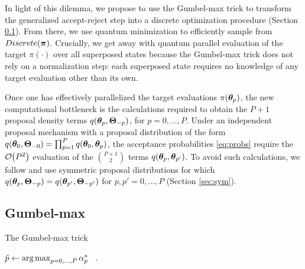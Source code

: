 \documentclass[12pt]{article} %
\newcommand{\argmax}{\operatornamewithlimits{arg\,max}}
\newcommand{\order}[1]{{\cal O}\hspace{-0.2em}\left( #1 \right)}
\begin{document}
 In light of this dilemma, we propose to use the Gumbel-max trick \citep{papandreou2011perturb} to transform the generalized accept-reject step into a discrete optimization procedure (Section \ref{sec:gm}).  From there, we use quantum minimization to efficiently sample from $Discrete(\boldsymbol{\pi})$. Crucially, we get away with quantum parallel evaluation of the target $\pi(\cdot)$ over all superposed states because the Gumbel-max trick does not rely on a normalization step: each superposed state requires no knowledge of any target evaluation other than its own.  

Once one has effectively parallelized the target evaluations $\pi(\boldsymbol{\theta}_{p})$, the new computational bottleneck is the calculations required to obtain the $P+1$ proposal density terms $q(\boldsymbol{\theta}_{p},\boldsymbol{\Theta}_{-p})$, for $p=0,\dots,P$.  Under an independent proposal mechanism with a proposal distribution of the form $q(\boldsymbol{\theta}_0,\boldsymbol{\Theta}_{-0})=\prod_{p=1}^Pq(\boldsymbol{\theta}_0,\boldsymbol{\theta}_{p})$, the acceptance probabilities \eqref{eq:probs} require the $\order{P^2}$ evaluation of the $P+1\choose 2$ terms $q(\boldsymbol{\theta}_{p},\boldsymbol{\theta}_{p'})$.  To avoid such calculations, we follow \citet{holbrook2021generating} and use symmetric proposal distributions for which $q(\boldsymbol{\theta}_{p},\boldsymbol{\Theta}_{-p}) = q(\boldsymbol{\theta}_{p'},\boldsymbol{\Theta}_{-p'})$ for $p,p'=0,\dots,P$ (Section \ref{sec:sym}).

\subsection{Gumbel-max}\label{sec:gm}
\newcommand{\p}{\mbox{p}}

\begin{algorithm}[!t]
	\caption{The Gumbel-max trick}\label{alg:gm}
	$\hat{p} \gets \argmax_{p=0,\dots,P}\alpha^*_{p}$\;
	\ .
	
	\vspace{0.5em}
\end{algorithm}
\end{document}
